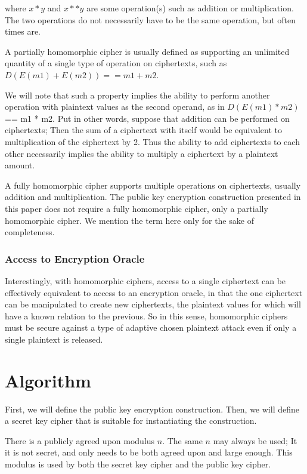 \documentclass[preprint]{iacrtrans}
\begin{document}
where $x * y$ and $x ** y$ are some operation(s) such as addition or multiplication. The two operations do not necessarily have to be the same operation, but often times are.

A partially homomorphic cipher is usually defined as supporting an unlimited quantity of a single type of operation on ciphertexts, such as $D(E(m1) + E(m2)) == m1 + m2$.

We will note that such a property implies the ability to perform another operation with plaintext values as the second operand, as in $D(E(m1) * m2)$ == m1 * m2. Put in other words, suppose that addition can be performed on ciphertexts; Then the sum of a ciphertext with itself would be equivalent to multiplication of the ciphertext by 2. Thus the ability to add ciphertexts to each other necessarily implies the ability to multiply a ciphertext by a plaintext amount.

A fully homomorphic cipher supports multiple operations on ciphertexts, usually addition and multiplication. The public key encryption construction presented in this paper does not require a fully homomorphic cipher, only a partially homomorphic cipher. We mention the term here only for the sake of completeness.

\subsubsection{Access to Encryption Oracle}
Interestingly, with homomorphic ciphers, access to a single ciphertext can be effectively equivalent to access to an encryption oracle, in that the one ciphertext can be manipulated to create new ciphertexts, the plaintext values for which will have a known relation to the previous. So in this sense, homomorphic ciphers must be secure against a type of adaptive chosen plaintext attack even if only a single plaintext is released.

\section{Algorithm}
First, we will define the public key encryption construction. Then, we will define a secret key cipher that is suitable for instantiating the construction.

There is a publicly agreed upon modulus $n$. The same $n$ may always be used; It it is not secret, and only needs to be both agreed upon and large enough. This modulus is used by both the secret key cipher and the public key cipher.
\end{document}
